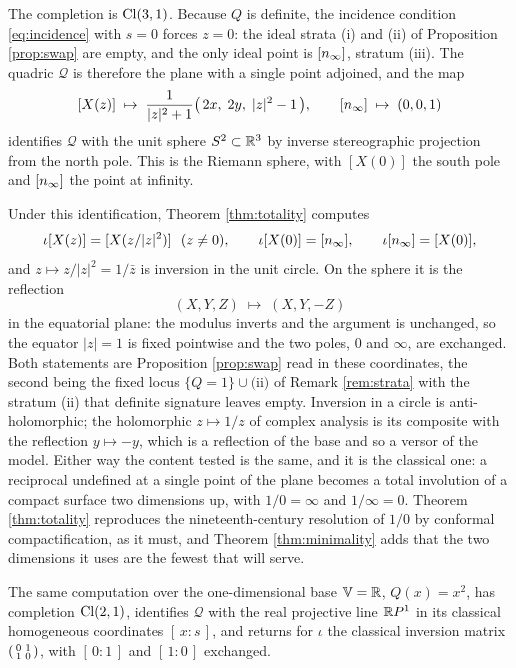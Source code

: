 The completion is $\mathrm{Cl}(3,1)$. Because $Q$ is definite, the incidence condition \eqref{eq:incidence} with $s = 0$ forces $z = 0$: the ideal strata (i) and (ii) of Proposition \ref{prop:swap} are empty, and the only ideal point is $[n_\infty]$, stratum (iii). The quadric $\mathcal{Q}$ is therefore the plane with a single point adjoined, and the map
\[
[X(z)] \;\mapsto\; \frac{1}{|z|^2+1}\bigl(\,2x,\; 2y,\; |z|^2 - 1\,\bigr), \qquad [n_\infty] \;\mapsto\; (0,0,1)
\]
identifies $\mathcal{Q}$ with the unit sphere $S^2 \subset \mathbb{R}^3$ by inverse stereographic projection from the north pole. This is the Riemann sphere, with $[X(0)]$ the south pole and $[n_\infty]$ the point at infinity.

Under this identification, Theorem \ref{thm:totality} computes
\[
\iota[X(z)] = [X(z/|z|^2)] \ \ (z \neq 0), \qquad \iota[X(0)] = [n_\infty], \qquad \iota[n_\infty] = [X(0)],
\]
and $z \mapsto z/|z|^2 = 1/\bar{z}$ is inversion in the unit circle. On the sphere it is the reflection
\[
(X, Y, Z) \;\mapsto\; (X, Y, -Z)
\]
in the equatorial plane: the modulus inverts and the argument is unchanged, so the equator $|z| = 1$ is fixed pointwise and the two poles, $0$ and $\infty$, are exchanged. Both statements are Proposition \ref{prop:swap} read in these coordinates, the second being the fixed locus $\{Q = 1\} \cup \text{(ii)}$ of Remark \ref{rem:strata} with the stratum (ii) that definite signature leaves empty. Inversion in a circle is anti-holomorphic; the holomorphic $z \mapsto 1/z$ of complex analysis is its composite with the reflection $y \mapsto -y$, which is a reflection of the base and so a versor of the model. Either way the content tested is the same, and it is the classical one: a reciprocal undefined at a single point of the plane becomes a total involution of a compact surface two dimensions up, with $1/0 = \infty$ and $1/\infty = 0$. Theorem \ref{thm:totality} reproduces the nineteenth-century resolution of $1/0$ by conformal compactification, as it must, and Theorem \ref{thm:minimality} adds that the two dimensions it uses are the fewest that will serve.

The same computation over the one-dimensional base $\mathbb{V} = \mathbb{R}$, $Q(x) = x^2$, has completion $\mathrm{Cl}(2,1)$, identifies $\mathcal{Q}$ with the real projective line $\mathbb{R} P^1$ in its classical homogeneous coordinates $[\,x : s\,]$, and returns for $\iota$ the classical inversion matrix $\begin{psmallmatrix} 0 & 1 \\ 1 & 0 \end{psmallmatrix}$, with $[\,0:1\,]$ and $[\,1:0\,]$ exchanged.

